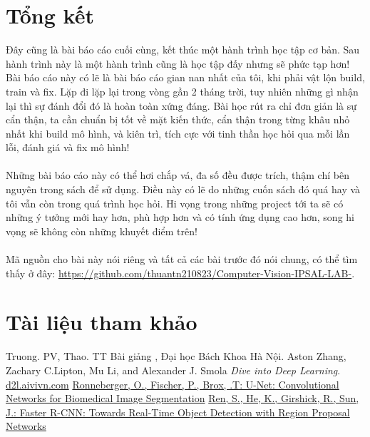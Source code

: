 \documentclass{article}
\begin{document}
\section{Tổng kết}
Đây cũng là bài báo cáo cuối cùng, kết thúc một hành trình học tập cơ bản. Sau hành trình này là một hành trình cũng là học tập đấy nhưng sẽ phức tạp hơn! Bài báo cáo này có lẽ là bài báo cáo gian nan nhất của tôi, khi phải vật lộn build, train và fix. Lặp đi lặp lại trong vòng gần 2 tháng trời, tuy nhiên những gì nhận lại thì sự đánh đổi đó là hoàn toàn xứng đáng. Bài học rút ra chỉ đơn giản là sự cẩn thận, ta cần chuẩn bị tốt về mặt kiến thức, cẩn thận trong từng khâu nhỏ nhất khi build mô hình, và kiên trì, tích cực với tinh thần học hỏi qua mỗi lần lỗi, đánh giá và fix mô hình!\\\\
Những bài báo cáo này có thể hơi chắp vá, đa số đều được trích, thậm chí bên nguyên trong sách để sử dụng. Điều này có lẽ do những cuốn sách đó quá hay và tôi vẫn còn trong quá trình học hỏi. Hi vọng trong những project tới ta sẽ có những ý tưởng mới hay hơn, phù hợp hơn và có tính ứng dụng cao hơn, song hi vọng sẽ không còn những khuyết điểm trên!\\\\
Mã nguồn cho bài này nói riêng và tất cả các bài trước đó nói chung, có thể tìm thấy ở đây: \url{https://github.com/thuantn210823/Computer-Vision-IPSAL-LAB-}.

\section{Tài liệu tham khảo}
    \begin{thebibliography}{9}
        Truong. PV, Thao. TT Bài giảng , Đại học Bách Khoa Hà Nội.
        Aston Zhang, Zachary C.Lipton, Mu Li, and Alexander J. Smola \emph{Dive into Deep Learning}.
        \url{d2l.aivivn.com}
        \href{https://arxiv.org/pdf/1505.04597.pdf}{Ronneberger, O., Fischer, P., Brox, .T: U-Net: Convolutional Networks for Biomedical Image Segmentation}
        \href{https://arxiv.org/pdf/1506.01497.pdf}{Ren, S., He, K., Girshick, R., Sun, J.: Faster R-CNN: Towards Real-Time Object Detection with Region Proposal Networks}
    \end{thebibliography}
\end{document}
